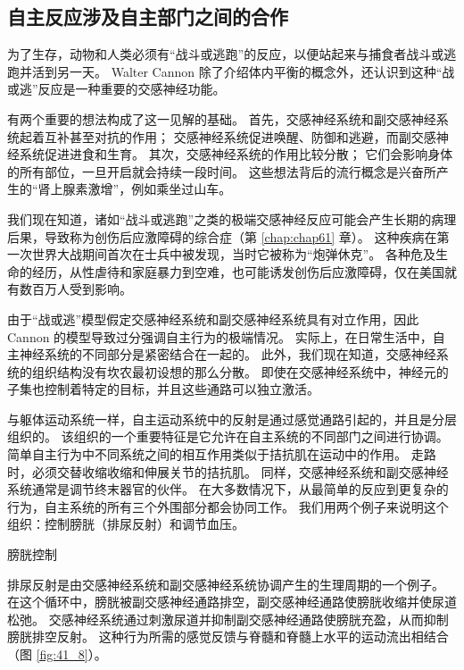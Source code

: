 \subsection{自主反应涉及自主部门之间的合作}

为了生存，动物和人类必须有“战斗或逃跑”的反应，以便站起来与捕食者战斗或逃跑并活到另一天。 Walter Cannon 除了介绍体内平衡的概念外，还认识到这种“战或逃”反应是一种重要的交感神经功能。

有两个重要的想法构成了这一见解的基础。 首先，交感神经系统和副交感神经系统起着互补甚至对抗的作用； 交感神经系统促进唤醒、防御和逃避，而副交感神经系统促进进食和生育。 其次，交感神经系统的作用比较分散； 它们会影响身体的所有部位，一旦开启就会持续一段时间。 这些想法背后的流行概念是兴奋所产生的“肾上腺素激增”，例如乘坐过山车。

我们现在知道，诸如“战斗或逃跑”之类的极端交感神经反应可能会产生长期的病理后果，导致称为创伤后应激障碍的综合症（第 \ref{chap:chap61} 章）。 这种疾病在第一次世界大战期间首次在士兵中被发现，当时它被称为“炮弹休克”。 各种危及生命的经历，从性虐待和家庭暴力到空难，也可能诱发创伤后应激障碍，仅在美国就有数百万人受到影响。

由于“战或逃”模型假定交感神经系统和副交感神经系统具有对立作用，因此 Cannon 的模型导致过分强调自主行为的极端情况。 实际上，在日常生活中，自主神经系统的不同部分是紧密结合在一起的。 此外，我们现在知道，交感神经系统的组织结构没有坎农最初设想的那么分散。 即使在交感神经系统中，神经元的子集也控制着特定的目标，并且这些通路可以独立激活。

与躯体运动系统一样，自主运动系统中的反射是通过感觉通路引起的，并且是分层组织的。 该组织的一个重要特征是它允许在自主系统的不同部门之间进行协调。 简单自主行为中不同系统之间的相互作用类似于拮抗肌在运动中的作用。 走路时，必须交替收缩收缩和伸展关节的拮抗肌。 同样，交感神经系统和副交感神经系统通常是调节终末器官的伙伴。 在大多数情况下，从最简单的反应到更复杂的行为，自主系统的所有三个外围部分都会协同工作。 我们用两个例子来说明这个组织：控制膀胱（排尿反射）和调节血压。

膀胱控制

排尿反射是由交感神经系统和副交感神经系统协调产生的生理周期的一个例子。 在这个循环中，膀胱被副交感神经通路排空，副交感神经通路使膀胱收缩并使尿道松弛。 交感神经系统通过刺激尿道并抑制副交感神经通路使膀胱充盈，从而抑制膀胱排空反射。 
这种行为所需的感觉反馈与脊髓和脊髓上水平的运动流出相结合（图 \ref{fig:41_8}）。

